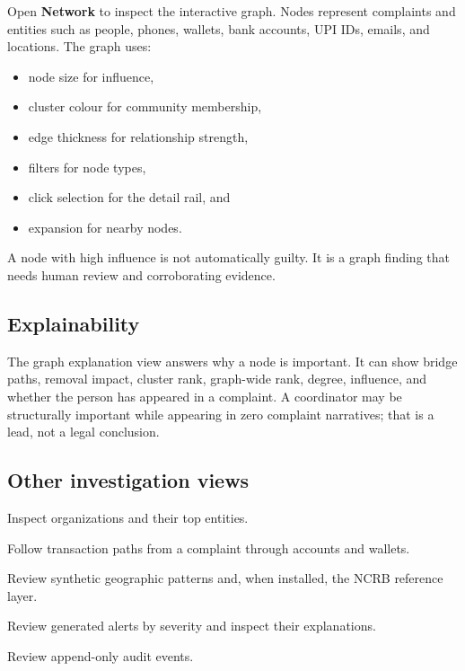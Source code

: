 \documentclass[11pt,a4paper]{article}
\begin{document}
Open \textbf{Network} to inspect the interactive graph. Nodes represent complaints and entities such as people, phones, wallets, bank accounts, UPI IDs, emails, and locations. The graph uses:

\begin{itemize}[leftmargin=*]
  \item node size for influence,
  \item cluster colour for community membership,
  \item edge thickness for relationship strength,
  \item filters for node types,
  \item click selection for the detail rail, and
  \item expansion for nearby nodes.
\end{itemize}

A node with high influence is not automatically guilty. It is a graph finding that needs human review and corroborating evidence.

\subsection{Explainability}

The graph explanation view answers why a node is important. It can show bridge paths, removal impact, cluster rank, graph-wide rank, degree, influence, and whether the person has appeared in a complaint. A coordinator may be structurally important while appearing in zero complaint narratives; that is a lead, not a legal conclusion.

\subsection{Other investigation views}

\begin{description}[leftmargin=3.2cm,style=nextline]
  \item[Clusters] Inspect organizations and their top entities.
  \item[Money Flow] Follow transaction paths from a complaint through accounts and wallets.
  \item[Geo] Review synthetic geographic patterns and, when installed, the NCRB reference layer.
  \item[Threat Feed] Review generated alerts by severity and inspect their explanations.
  \item[Timeline] Review append-only audit events.
\end{description}
\end{document}
